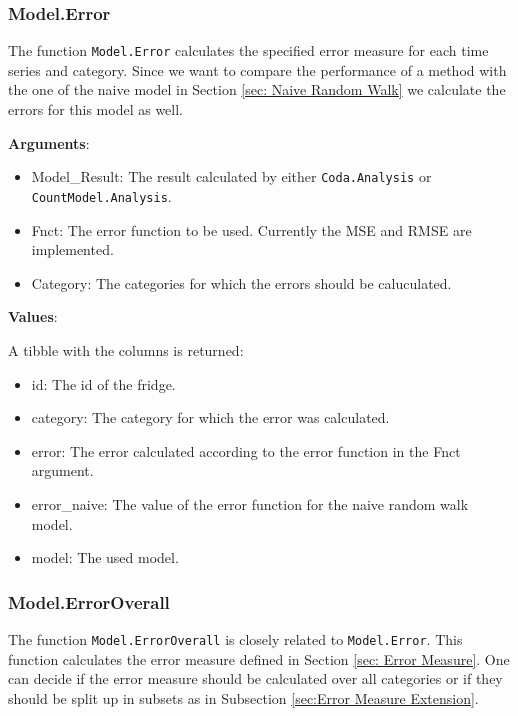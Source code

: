 \subsubsection{Model.Error}
\label{sec:Model.Error}

The function \texttt{Model.Error} calculates the specified error measure for each time series and category. Since we want to compare the performance of a method with the one of the naive model in Section \ref{sec: Naive Random Walk} we calculate the errors for this model as well. 

\textbf{Arguments}:

\begin{itemize}
	\item Model\_Result: The result calculated by either \texttt{Coda.Analysis} or \texttt{CountModel.Analysis}.
	\item Fnct: The error function to be used. Currently the MSE and RMSE are implemented. 
	\item Category: The categories for which the errors should be caluculated.
\end{itemize}

\textbf{Values}:

A tibble with the columns is returned: 

\begin{itemize}
	\item id: The id of the fridge.
	\item category: The category for which the error was calculated. 
	\item error: The error calculated according to the error function in the Fnct argument. 
	\item error\_naive: The value of the error function for the naive random walk model.
	\item model: The used model.  
\end{itemize}

\subsubsection{Model.ErrorOverall}
\label{sec:Model.ErrorOverall}

The function \texttt{Model.ErrorOverall} is closely related to \texttt{Model.Error}. This function calculates the error measure defined in Section \ref{sec: Error Measure}. One can decide if the error measure should be calculated over all categories or if they should be split up in subsets as in Subsection \ref{sec:Error Measure Extension}.

